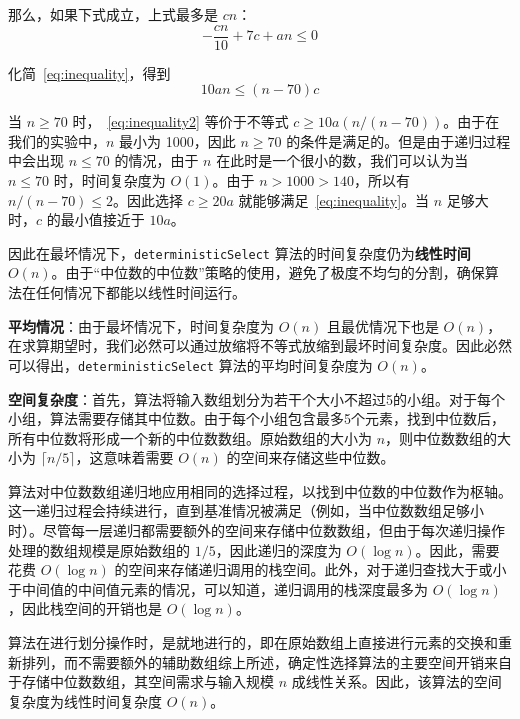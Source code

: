 那么，如果下式成立，上式最多是 $cn$：\begin{equation}
    -\frac{cn}{10} + 7c + an \leq 0
    \label{eq:inequality}
\end{equation}

化简~\autoref{eq:inequality}，得到 \begin{equation}
    10an \leq (n - 70)c
    \label{eq:inequality2}
\end{equation}

当 $n \geq 70$ 时，~\autoref{eq:inequality2} 等价于不等式 $c \geq 10a(n/(n-70))$。由于在我们的实验中，$n$ 最小为 1000，因此 $n \geq 70$ 的条件是满足的。但是由于递归过程中会出现 $n \leq 70$ 的情况，由于 $n$ 在此时是一个很小的数，我们可以认为当 $n \leq 70$ 时，时间复杂度为 $O(1)$。由于 $n > 1000 > 140$，所以有 $n/(n-70) \leq 2$。因此选择 $c \ge 20a$ 就能够满足~\autoref{eq:inequality}。当 $n$ 足够大时，$c$ 的最小值接近于 $10a$。

因此在最坏情况下，\texttt{deterministicSelect} 算法的时间复杂度仍为\textbf{线性时间} \( O(n) \)。由于``中位数的中位数''策略的使用，避免了极度不均匀的分割，确保算法在任何情况下都能以线性时间运行。

\textbf{平均情况}：由于最坏情况下，时间复杂度为 $O(n)$ 且最优情况下也是 $O(n)$，在求算期望时，我们必然可以通过放缩将不等式放缩到最坏时间复杂度。因此必然可以得出，\texttt{deterministicSelect} 算法的平均时间复杂度为 \( O(n) \)。

\textbf{空间复杂度}：首先，算法将输入数组划分为若干个大小不超过5的小组。对于每个小组，算法需要存储其中位数。由于每个小组包含最多5个元素，找到中位数后，所有中位数将形成一个新的中位数数组。原始数组的大小为 \( n \)，则中位数数组的大小为 \( \lceil n/5 \rceil \)，这意味着需要 \( O(n) \) 的空间来存储这些中位数。

算法对中位数数组递归地应用相同的选择过程，以找到中位数的中位数作为枢轴。这一递归过程会持续进行，直到基准情况被满足（例如，当中位数数组足够小时）。尽管每一层递归都需要额外的空间来存储中位数数组，但由于每次递归操作处理的数组规模是原始数组的 \( 1/5 \)，因此递归的深度为 \( O(\log n) \)。因此，需要花费 \( O(\log n) \) 的空间来存储递归调用的栈空间。此外，对于递归查找大于或小于中间值的中间值元素的情况，可以知道，递归调用的栈深度最多为 $O(\log n)$，因此栈空间的开销也是 $O(\log n)$。

算法在进行划分操作时，是就地进行的，即在原始数组上直接进行元素的交换和重新排列，而不需要额外的辅助数组综上所述，确定性选择算法的主要空间开销来自于存储中位数数组，其空间需求与输入规模 \( n \) 成线性关系。因此，该算法的空间复杂度为线性时间复杂度 \( O(n) \)。

